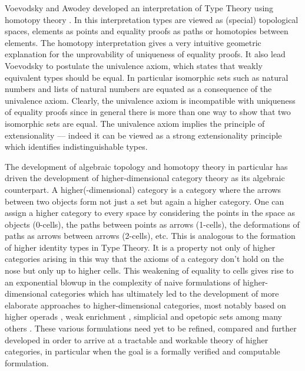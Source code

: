 \documentclass[twocolumn,a4paper,11pt]{article}
\begin{document}
{%
Voevodsky and Awodey developed an interpretation of Type Theory using
homotopy theory
\cite{voevodsky:equivalenceAndUnivalence,awodey:tth}. In this
interpretation types are viewed as (special) topological spaces,
elements as points and equality proofs as paths or homotopies between
elements. The homotopy interpretation gives a very intuitive geometric
explanation for the unprovability of uniqueness of equality proofs. It
also lead Voevodsky to postulate the univalence axiom, which states
that weakly equivalent types should be equal. In particular isomorphic
sets such as natural numbers and lists of natural numbers are equated
as a consequence of the univalence axiom. Clearly, the univalence
axiom is incompatible with uniqueness of equality proofs since in
general there is more than one way to show that two isomorphic sets
are equal. The univalence axiom implies the principle of
extensionality --- indeed it can be viewed as a strong extensionality
principle which identifies indistinguishable types.

The development of algebraic topology and homotopy theory in
particular has driven the development of higher-dimensional category
theory as its algebraic counterpart. A higher(-dimensional) category
is a category where the arrows between two objects form not just a set
but again a higher category. One can assign a higher category to every
space by considering the points in the space as objects (0-cells), the
paths between points as arrows (1-cells), the deformations of paths as
arrows between arrows (2-cells), etc. This is analogous to the
formation of higher identity types in Type Theory. It is a property
not only of higher categories arising in this way that the axioms of a
category don't hold on the nose but only up to higher cells. This
weakening of equality to cells gives rise to an exponential blowup in
the complexity of naive formulations of higher-dimensional categories
\cite{gordonPowerStreet:tricategories,trimble:tetracategories} which
has ultimately led to the development of more elaborate approaches to
higher-dimensional categories, most notably based on higher operads
\cite{batanin:monoidal,cheng:comparingOperadicTheories}, weak
enrichment \cite{leinster:survey}, simplicial and opetopic sets
\cite{joyal02:quasicategories,baezDolan:opetopes,cheng:opetopicAndMultitopicFoundations}
among many others \cite{leinster:HOHC,leinster:survey,chengLauda:guidebook}.  These various formulations need yet to be
refined, compared and further developed in order to arrive at a
tractable and workable theory of higher categories, in particular when
the goal is a formally verified and computable formulation.

}
\end{document}
